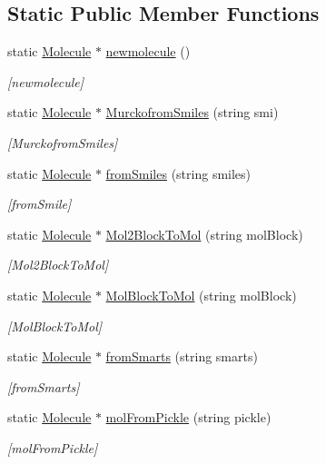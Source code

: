 \subsection*{Static Public Member Functions}
\begin{DoxyCompactItemize}
\item 
static \mbox{\hyperlink{class_molecule}{Molecule}} $\ast$ \mbox{\hyperlink{class_molecule_ab7813a959f80b5291f43f6b84b775ff5}{newmolecule}} ()
\begin{DoxyCompactList}\small\item\em \mbox{[}newmolecule\mbox{]} \end{DoxyCompactList}\item 
static \mbox{\hyperlink{class_molecule}{Molecule}} $\ast$ \mbox{\hyperlink{class_molecule_aa5264564f658fcca3635b11f6735c874}{Murckofrom\+Smiles}} (string smi)
\begin{DoxyCompactList}\small\item\em \mbox{[}Murckofrom\+Smiles\mbox{]} \end{DoxyCompactList}\item 
static \mbox{\hyperlink{class_molecule}{Molecule}} $\ast$ \mbox{\hyperlink{class_molecule_ab069ae65453c626353782b9accc1235a}{from\+Smiles}} (string smiles)
\begin{DoxyCompactList}\small\item\em \mbox{[}from\+Smile\mbox{]} \end{DoxyCompactList}\item 
static \mbox{\hyperlink{class_molecule}{Molecule}} $\ast$ \mbox{\hyperlink{class_molecule_a689a07968c44db22ef925eee7f70295b}{Mol2\+Block\+To\+Mol}} (string mol\+Block)
\begin{DoxyCompactList}\small\item\em \mbox{[}Mol2\+Block\+To\+Mol\mbox{]} \end{DoxyCompactList}\item 
static \mbox{\hyperlink{class_molecule}{Molecule}} $\ast$ \mbox{\hyperlink{class_molecule_a75b3d11ee3b2ccacad2f5ae1c6909b19}{Mol\+Block\+To\+Mol}} (string mol\+Block)
\begin{DoxyCompactList}\small\item\em \mbox{[}Mol\+Block\+To\+Mol\mbox{]} \end{DoxyCompactList}\item 
static \mbox{\hyperlink{class_molecule}{Molecule}} $\ast$ \mbox{\hyperlink{class_molecule_a2edb1181b6a08aa8da482ff6a08ad157}{from\+Smarts}} (string smarts)
\begin{DoxyCompactList}\small\item\em \mbox{[}from\+Smarts\mbox{]} \end{DoxyCompactList}\item 
static \mbox{\hyperlink{class_molecule}{Molecule}} $\ast$ \mbox{\hyperlink{class_molecule_a2425937fefa34d28560ef4ad152b9602}{mol\+From\+Pickle}} (string pickle)
\begin{DoxyCompactList}\small\item\em \mbox{[}mol\+From\+Pickle\mbox{]} \end{DoxyCompactList}\end{DoxyCompactItemize}


